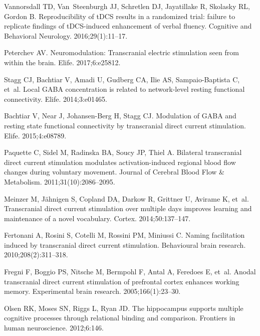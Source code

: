 \documentclass[10pt,letterpaper]{article}
\begin{document}
\begin{thebibliography}{10}
Vannorsdall TD, Van~Steenburgh JJ, Schretlen DJ, Jayatillake R, Skolasky RL,
  Gordon B.
\newblock Reproducibility of tDCS results in a randomized trial: failure to
  replicate findings of tDCS-induced enhancement of verbal fluency.
\newblock Cognitive and Behavioral Neurology. 2016;29(1):11--17.

Peterchev AV.
\newblock Neuromodulation: Transcranial electric stimulation seen from within
  the brain.
\newblock Elife. 2017;6:e25812.

Stagg CJ, Bachtiar V, Amadi U, Gudberg CA, Ilie AS, Sampaio-Baptista C, et~al.
\newblock Local GABA concentration is related to network-level resting
  functional connectivity.
\newblock Elife. 2014;3:e01465.

Bachtiar V, Near J, Johansen-Berg H, Stagg CJ.
\newblock Modulation of GABA and resting state functional connectivity by
  transcranial direct current stimulation.
\newblock Elife. 2015;4:e08789.

Paquette C, Sidel M, Radinska BA, Soucy JP, Thiel A.
\newblock Bilateral transcranial direct current stimulation modulates
  activation-induced regional blood flow changes during voluntary movement.
\newblock Journal of Cerebral Blood Flow \& Metabolism. 2011;31(10):2086--2095.

Meinzer M, J{\"a}hnigen S, Copland DA, Darkow R, Grittner U, Avirame K, et~al.
\newblock Transcranial direct current stimulation over multiple days improves
  learning and maintenance of a novel vocabulary.
\newblock Cortex. 2014;50:137--147.

Fertonani A, Rosini S, Cotelli M, Rossini PM, Miniussi C.
\newblock Naming facilitation induced by transcranial direct current
  stimulation.
\newblock Behavioural brain research. 2010;208(2):311--318.

Fregni F, Boggio PS, Nitsche M, Bermpohl F, Antal A, Feredoes E, et~al.
\newblock Anodal transcranial direct current stimulation of prefrontal cortex
  enhances working memory.
\newblock Experimental brain research. 2005;166(1):23--30.

Olsen RK, Moses SN, Riggs L, Ryan JD.
\newblock The hippocampus supports multiple cognitive processes through
  relational binding and comparison.
\newblock Frontiers in human neuroscience. 2012;6:146.


\end{thebibliography}
\end{document}
